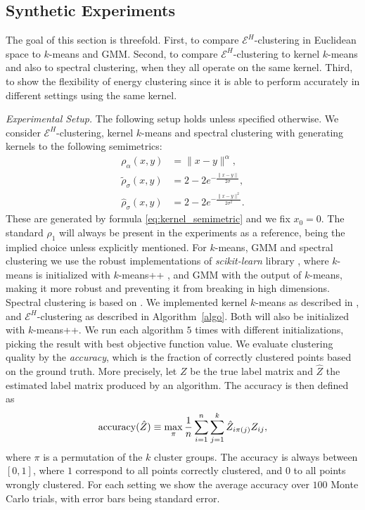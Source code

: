 \documentclass{article}
\begin{document}
\subsection{Synthetic Experiments}

The goal of this section is threefold. First, to compare
$\mathcal{E}^H$-clustering in Euclidean space 
to $k$-means and GMM. 
Second, to compare $\mathcal{E}^H$-clustering  to
kernel $k$-means and also to spectral clustering, when they all operate
on the same kernel.
Third, to show the flexibility
of energy clustering since it is able to perform 
accurately in different settings using the same kernel.

\emph{Experimental Setup.} 
The following setup holds unless specified
otherwise. 
We consider
$\mathcal{E}^H$-clustering, kernel $k$-means and spectral clustering
with \mbox{generating} kernels to the following semimetrics:
\begin{subequations}
\label{eq:test_metrics}
\begin{align}
\rho_{\alpha}(x,y) &= \| x-y \|^{\alpha}, \\
\widetilde{\rho}_{\sigma}(x,y) &= 2 - 2 e^{-\tfrac{\|x-y\|}{2 \sigma}},  \\
\widehat{\rho}_{\sigma}(x,y) &= 2 - 2 e^{-\tfrac{\|x-y\|^2}{2 \sigma^2}}.  
\end{align}
\end{subequations}
These are generated by formula \eqref{eq:kernel_semimetric}
and we fix $x_0=0$.
The standard $\rho_1$ will always be present in the experiments 
as a reference, being the implied choice unless explicitly mentioned.
For $k$-means, GMM and spectral clustering we use the robust 
implementations of \emph{scikit-learn} library \citep{scikit-learn}, where  
$k$-means is initialized with 
$k$-means++ \citep{Vassilvitskii}, 
and GMM with the output of $k$-means, making it more robust and preventing
it from breaking in high dimensions. 
Spectral clustering is based on \citet{Malik}. 
We implemented kernel $k$-means
as described in \citet{Dhillon2,Dhillon}, and $\mathcal{E}^H$-clustering
as described in Algorithm~\ref{algo}. Both
will also be initialized with $k$-means++.
We run each algorithm $5$ times with different initializations, picking
the result with best objective function value. 
We evaluate clustering quality by
the \emph{accuracy}, which is the fraction of correctly clustered points
based on the ground truth. More precisely, let $Z$ be the true label
matrix and $\hat{Z}$ the estimated label matrix produced by 
an algorithm. The accuracy is then defined as
\begin{equation}
\label{eq:accuracy}
\textnormal{accuracy}(\hat{Z}) \equiv \max_\pi \dfrac{1}{n} \sum_{i=1}^n
\sum_{j=1}^k \hat{Z}_{i \pi(j)} Z_{ij},
\end{equation}
where $\pi$ is a permutation of the $k$ cluster groups. The accuracy
is always between $[0,1]$, where $1$ correspond to all points correctly
clustered, and $0$ to all points wrongly clustered.
For each setting we show 
the average accuracy over $100$ Monte
Carlo trials, with error bars being standard error.
\end{document}
